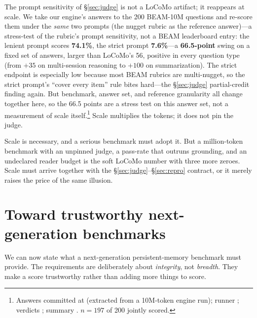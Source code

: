 \documentclass[11pt]{article}
\begin{document}
The prompt sensitivity of \S\ref{sec:judge} is not a LoCoMo artifact; it reappears at scale. We take our engine's answers to the 200 BEAM-10M questions and re-score them under the \emph{same} two prompts (the nugget rubric as the reference answer)---a stress-test of the rubric's prompt sensitivity, not a BEAM leaderboard entry: the lenient prompt scores \textbf{74.1\%}, the strict prompt \textbf{7.6\%}---a \textbf{66.5-point} swing on a fixed set of answers, larger than LoCoMo's 56, positive in every question type (from $+35$ on multi-session reasoning to $+100$ on summarization). The strict endpoint is especially low because most BEAM rubrics are multi-nugget, so the strict prompt's ``cover every item'' rule bites hard---the \S\ref{sec:judge} partial-credit finding again. But benchmark, answer set, and reference granularity all change together here, so the 66.5 points are a stress test on this answer set, not a measurement of scale itself.\footnote{Answers committed at  (extracted from a 10M-token engine run); runner ; verdicts ; summary . $n=197$ of 200 jointly scored.} Scale multiplies the tokens; it does not pin the judge.

Scale is necessary, and a serious benchmark must adopt it. But a million-token benchmark with an unpinned judge, a pass-rate that outruns grounding, and an undeclared reader budget is the soft LoCoMo number with three more zeroes. Scale must arrive together with the \S\ref{sec:judge}--\S\ref{sec:repro} contract, or it merely raises the price of the same illusion.

\section{Toward trustworthy next-generation benchmarks}\label{sec:nextgen}

We can now state what a next-generation persistent-memory benchmark must provide. The requirements are deliberately about \emph{integrity}, not \emph{breadth}. They make a score trustworthy rather than adding more things to score.
\end{document}
